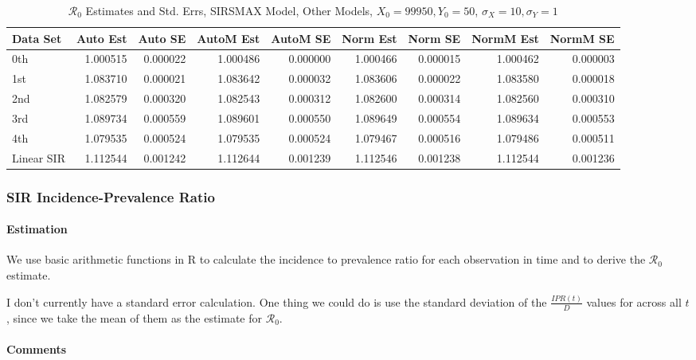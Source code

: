 \documentclass[12pt]{article}
\newcommand{\rr}{\ensuremath{\mathcal{R}_0}}
\begin{document}
\begin{table}[H]
	
	\caption{$\rr$ Estimates and Std. Errs, SIRSMAX Model,
		Other Models, $X_0 = 99950, Y_0 = 50$, 
		$\sigma_X = 10, \sigma_Y = 1$}
	\begin{footnotesize}
		\hskip -1cm
		\begin{tabular}{l|r|r|r|r|r|r|r|r}
			\hline
			Data Set & Auto Est & Auto SE & AutoM Est & AutoM SE & Norm Est & Norm SE & NormM Est & NormM SE\\
			\hline
			0th & 1.000515 & 0.000022 & 1.000486 & 0.000000 & 1.000466 & 0.000015 & 1.000462 & 0.000003\\
			\hline
			1st & 1.083710 & 0.000021 & 1.083642 & 0.000032 & 1.083606 & 0.000022 & 1.083580 & 0.000018\\
			\hline
			2nd & 1.082579 & 0.000320 & 1.082543 & 0.000312 & 1.082600 & 0.000314 & 1.082560 & 0.000310\\
			\hline
			3rd & 1.089734 & 0.000559 & 1.089601 & 0.000550 & 1.089649 & 0.000554 & 1.089634 & 0.000553\\
			\hline
			4th & 1.079535 & 0.000524 & 1.079535 & 0.000524 & 1.079467 & 0.000516 & 1.079486 & 0.000511\\
			\hline
			Linear SIR & 1.112544 & 0.001242 & 1.112644 & 0.001239 & 1.112546 & 0.001238 & 1.112544 & 0.001236\\
			\hline
		\end{tabular}
	\end{footnotesize}
\end{table}

\subsubsection{SIR Incidence-Prevalence Ratio}

\paragraph{Estimation}

We use basic arithmetic functions in R to calculate the incidence to prevalence ratio for each observation in time and to derive the $\rr$ estimate. 

I don't currently have a standard error calculation. One thing we could do is use the standard deviation of the $\frac{IPR(t)}{D}$ values for across all $t$, since we take the mean of them as the estimate for $\rr$.  

\paragraph{Comments}
\end{document}
